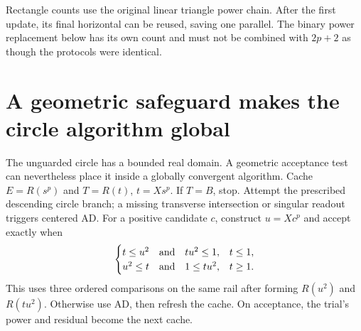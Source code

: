 \documentclass[11pt,a4paper]{article}
\begin{document}
Rectangle counts use the original linear triangle power chain. After the first update, its final horizontal can be reused, saving one parallel. The binary power replacement below has its own count and must not be combined with $2p+2$ as though the protocols were identical.
\clearpage

\section{A geometric safeguard makes the circle algorithm global}\label{sec:safeguard}
The unguarded circle has a bounded real domain. A geometric acceptance test can nevertheless place it inside a globally convergent algorithm. Cache $E=R(s^p)$ and $T=R(t)$, $t=Xs^p$. If $T=B$, stop. Attempt the prescribed descending circle branch; a missing transverse intersection or singular readout triggers centered AD. For a positive candidate $c$, construct $u=Xc^p$ and accept exactly when
\begin{equation}\label{eq:gate}
 \begin{cases}
 t\le u^2\quad\hbox{and}\quad tu^2\le1,&t\le1,\\
 u^2\le t\quad\hbox{and}\quad1\le tu^2,&t\ge1.
 \end{cases}
\end{equation}
This uses three ordered comparisons on the same rail after forming $R(u^2)$ and $R(tu^2)$. Otherwise use AD, then refresh the cache. On acceptance, the trial's power and residual become the next cache.
\end{document}
